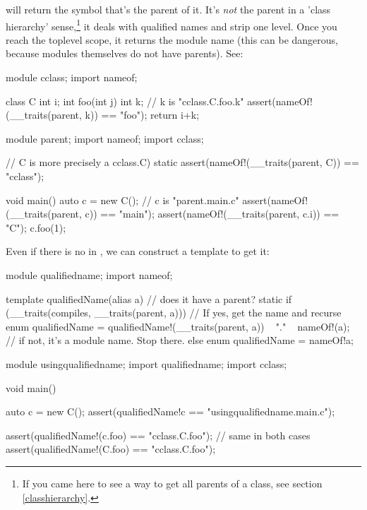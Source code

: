  will return the symbol that's the parent of it. It's \emph{not} the parent in a 'class hierarchy' sense,\footnote{ If you came here to see a way to get all parents of a class, see section \ref{classhierarchy}.} it deals with qualified names and strip one level. Once you reach the toplevel scope, it returns the module name (this can be dangerous, because modules themselves do not have parents). See:

\begin{dcode}
module cclass;
import nameof;

class C
{
    int i;
    int foo(int j)
    {
        int k; // k is "cclass.C.foo.k"
        assert(nameOf!(__traits(parent, k)) == "foo");
        return i+k;
    }
}
\end{dcode}

\begin{dcode}
module parent;
import nameof;
import cclass;

// C is more precisely a cclass.C)
static assert(nameOf!(__traits(parent, C)) == "cclass");

void main() 
{
    auto c = new C(); // c is "parent.main.c"
    assert(nameOf!(__traits(parent, c)) == "main");
    assert(nameOf!(__traits(parent, c.i)) == "C");
    c.foo(1);
}
\end{dcode}

Even if there is no  in , we can construct a template to get it:

\begin{dcode}
module qualifiedname;
import nameof;

template qualifiedName(alias a)
{
    // does it have a parent?
    static if (__traits(compiles, __traits(parent, a)))
    // If yes, get the name and recurse
        enum qualifiedName = qualifiedName!(__traits(parent, a)) 
                           ~  "." ~ nameOf!(a);
    // if not, it's a module name. Stop there.
    else
        enum qualifiedName = nameOf!a;
}
\end{dcode}

\begin{dcode}
module usingqualifiedname;
import qualifiedname;
import cclass;

void main()
{
    auto c = new C();
    assert(qualifiedName!c == "usingqualifiedname.main.c");
    
    assert(qualifiedName!(c.foo) == "cclass.C.foo"); // same in both cases
    assert(qualifiedName!(C.foo) == "cclass.C.foo");
}
\end{dcode}


